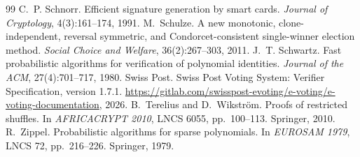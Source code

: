 \documentclass[11pt,a4paper]{article}
\theoremstyle{remark}
\begin{document}
\begin{thebibliography}{99}
 C.~P. Schnorr. Efficient signature generation by smart cards. \emph{Journal of Cryptology}, 4(3):161--174, 1991.
 M.~Schulze. A new monotonic, clone-independent, reversal symmetric, and Condorcet-consistent single-winner election method. \emph{Social Choice and Welfare}, 36(2):267--303, 2011.
 J.~T. Schwartz. Fast probabilistic algorithms for verification of polynomial identities. \emph{Journal of the ACM}, 27(4):701--717, 1980.
 Swiss Post. Swiss Post Voting System: Verifier Specification, version 1.7.1. \url{https://gitlab.com/swisspost-evoting/e-voting/e-voting-documentation}, 2026.
 B.~Terelius and D.~Wikstr{\"o}m. Proofs of restricted shuffles. In \emph{AFRICACRYPT 2010}, LNCS 6055, pp.~100--113. Springer, 2010.
 R.~Zippel. Probabilistic algorithms for sparse polynomials. In \emph{EUROSAM 1979}, LNCS 72, pp.~216--226. Springer, 1979.
\end{thebibliography}
\end{document}
